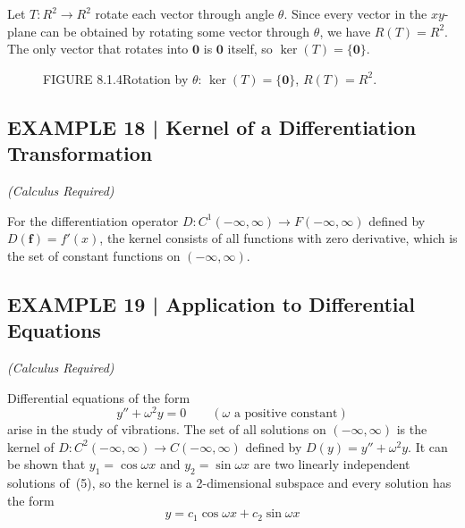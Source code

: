 \documentclass{article}
\begin{document}
Let $T : R^2 \to R^2$ rotate each vector through angle $\theta$. Since every vector in the
$xy$-plane can be obtained by rotating some vector through $\theta$, we have $R(T) = R^2$.
The only vector that rotates into $\mathbf{0}$ is $\mathbf{0}$ itself, so $\ker(T) = \{\mathbf{0}\}$.

\begin{figure}[ht]
\centering
{}
\caption*{FIGURE 8.1.4\quad Rotation by $\theta$: $\ker(T)=\{\mathbf{0}\}$, $R(T)=R^2$.}
\end{figure}

\subsection*{EXAMPLE 18 | Kernel of a Differentiation Transformation}
\textit{(Calculus Required)}

For the differentiation operator $D : C^1(-\infty,\infty) \to F(-\infty,\infty)$ defined
by $D(\mathbf{f}) = f'(x)$, the kernel consists of all functions with zero derivative,
which is the set of constant functions on $(-\infty,\infty)$.

\subsection*{EXAMPLE 19 | Application to Differential Equations}
\textit{(Calculus Required)}

Differential equations of the form
\[
  y'' + \omega^2 y = 0 \qquad (\omega \text{ a positive constant}) \tag{5}
\]
arise in the study of vibrations. The set of all solutions on $(-\infty,\infty)$ is the
kernel of $D : C^2(-\infty,\infty) \to C(-\infty,\infty)$ defined by $D(y) = y''+\omega^2 y$.
It can be shown that $y_1 = \cos\omega x$ and $y_2 = \sin\omega x$ are two linearly
independent solutions of~(5), so the kernel is a 2-dimensional subspace and every solution
has the form
\[
  y = c_1 \cos\omega x + c_2 \sin\omega x \tag{6}
\]
\end{document}
